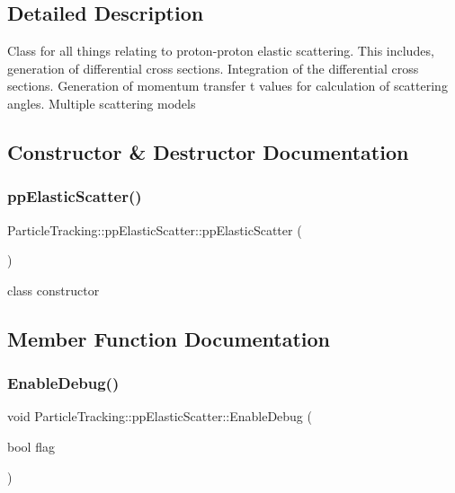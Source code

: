 \subsection{Detailed Description}
Class for all things relating to proton-\/proton elastic scattering. This includes, generation of differential cross sections. Integration of the differential cross sections. Generation of momentum transfer t values for calculation of scattering angles. Multiple scattering models 

\subsection{Constructor \& Destructor Documentation}
\mbox{\label{classParticleTracking_1_1ppElasticScatter_a930b5acccec4e874db62a1e02d57bc91}} 
\subsubsection{\texorpdfstring{pp\+Elastic\+Scatter()}{ppElasticScatter()}}
{\footnotesize\ttfamily Particle\+Tracking\+::pp\+Elastic\+Scatter\+::pp\+Elastic\+Scatter (\begin{DoxyParamCaption}{ }\end{DoxyParamCaption})\hspace{0.3cm}{\ttfamily [inline]}}

class constructor 

\subsection{Member Function Documentation}
\mbox{\label{classParticleTracking_1_1ppElasticScatter_a064b2815b165071e41183abd2e0ff5c7}} 
\subsubsection{\texorpdfstring{Enable\+Debug()}{EnableDebug()}}
{\footnotesize\ttfamily void Particle\+Tracking\+::pp\+Elastic\+Scatter\+::\+Enable\+Debug (\begin{DoxyParamCaption}\item[{bool}]{flag }\end{DoxyParamCaption})}

